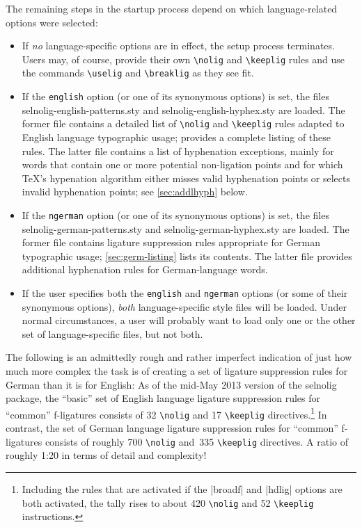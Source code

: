 \documentclass[11pt]{article}
\newcommand{\pkg}[1]{\textsf{#1}}
\newcommand{\opt}[1]{\texttt{#1}}
\newcommand{\cmmd}[1]{\texttt{\textbackslash #1}}
\begin{document}
The remaining steps in the startup process depend on which language-related options were selected:
\begin{itemize}
\item If \emph{no} language-specific options are in effect, the setup process terminates. Users may, of course, provide their own \cmmd{nolig} and \cmmd{keeplig} rules and use the commands \cmmd{uselig} and \cmmd{breaklig} as they see fit.

\item If the \opt{english} option (or one of its synonymous options) is set, the files \pkg{selnolig-english-patterns.sty} and \pkg{selnolig-english-hyphex.sty} are loaded. The former file contains a detailed list of \cmmd{nolig} and \cmmd{keeplig} rules adapted to English language typographic usage;  provides a complete listing of these rules. The latter file contains a list of hyphenation exceptions, mainly for words that contain one or more potential non-ligation points and for which \TeX's hypenation algorithm either misses valid hyphenation points or selects invalid hyphenation points; see \cref{sec:addlhyph} below.

\item If the \opt{ngerman} option (or one of its synonymous options) is set, the files \pkg{selnolig-german-patterns.sty} and \pkg{selnolig-german-hyphex.sty} are loaded. The former file contains ligature suppression rules appropriate for German typographic usage; \cref{sec:germ-listing} lists its contents. The latter file provides additional hyphenation rules for German-language words.

\item If the user specifies both the \opt{english} and \opt{ngerman} options (or some of their synonymous options), \emph{both} language-specific style files will be loaded. Under normal circumstances, a user will probably want to load only one or the other set of language-specific files, but not both.
\end{itemize}

The following is an admittedly rough and rather imperfect indication of just how much more complex the task is of creating a set of ligature suppression rules for German than it is for English: As of the mid-May 2013 version of the \pkg{selnolig} package, the \enquote{basic} set of English language ligature suppression rules for \enquote{common} f-ligatures consists of 32 \cmmd{nolig} and 17 \cmmd{keeplig} directives.\footnote{Including the rules that are activated if the |broadf| and |hdlig| options are both activated, the tally rises to about 420 \cmmd{nolig} and 52 \cmmd{keeplig} instructions.} In contrast, the set of German language ligature suppression rules for \enquote{common} f-ligatures consists of roughly 700 \cmmd{nolig} and~335 \cmmd{keeplig} directives. A ratio of roughly 1:20 in terms of detail and complexity!
\end{document}
